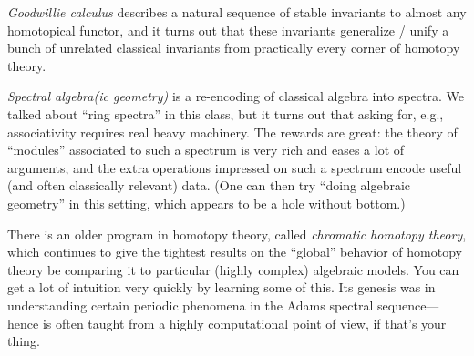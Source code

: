 \textit{Goodwillie calculus} describes a natural sequence of stable invariants to almost any homotopical functor, and it turns out that these invariants generalize / unify a bunch of unrelated classical invariants from practically every corner of homotopy theory.

\textit{Spectral algebra(ic geometry)} is a re-encoding of classical algebra into spectra.  We talked about ``ring spectra'' in this class, but it turns out that asking for, e.g., associativity requires real heavy machinery.  The rewards are great: the theory of ``modules'' associated to such a spectrum is very rich and eases a lot of arguments, and the extra operations impressed on such a spectrum encode useful (and often classically relevant) data.  (One can then try ``doing algebraic geometry'' in this setting, which appears to be a hole without bottom.)

There is an older program in homotopy theory, called \textit{chromatic homotopy theory}, which continues to give the tightest results on the ``global'' behavior of homotopy theory be comparing it to particular (highly complex) algebraic models.  You can get a lot of intuition very quickly by learning some of this.  Its genesis was in understanding certain periodic phenomena in the Adams spectral sequence---hence is often taught from a highly computational point of view, if that's your thing.
